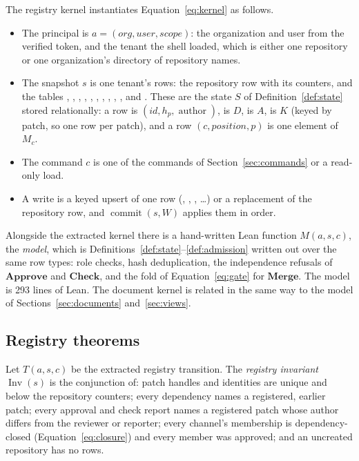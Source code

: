 The registry kernel instantiates Equation~\ref{eq:kernel} as follows.
\begin{itemize}
\item The principal is $a=(\mathit{org},\mathit{user},\mathit{scope})$: the organization and user from the verified token, and the tenant the shell loaded, which is either one repository or one organization's directory of repository names.
\item The snapshot $s$ is one tenant's rows: the repository row with its counters, and the tables , , , , , , , , , , and . These are the state $S$ of Definition~\ref{def:state} stored relationally: a  row is $(\mathit{id},h_p,\operatorname{author})$,  is $D$,  is $A$,  is $K$ (keyed by patch, so one row per patch), and a  row $(c,\mathit{position},p)$ is one element of $M_c$.
\item The command $c$ is one of the commands of Section~\ref{sec:commands} or a read-only load.
\item A write is a keyed upsert of one row (, , , \dots) or a replacement of the repository row, and $\operatorname{commit}(s,W)$ applies them in order.
\end{itemize}
Alongside the extracted kernel there is a hand-written Lean function $M(a,s,c)$, the \emph{model}, which is Definitions~\ref{def:state}--\ref{def:admission} written out over the same row types: role checks, hash deduplication, the independence refusals of $\mathbf{Approve}$ and $\mathbf{Check}$, and the fold of Equation~\ref{eq:gate} for $\mathbf{Merge}$. The model is 293 lines of Lean. The document kernel is related in the same way to the model of Sections~\ref{sec:documents} and~\ref{sec:views}.

\subsection{Registry theorems}\label{sec:registry}
Let $T(a,s,c)$ be the extracted registry transition. The \emph{registry invariant} $\operatorname{Inv}(s)$ is the conjunction of: patch handles and identities are unique and below the repository counters; every dependency names a registered, earlier patch; every approval and check report names a registered patch whose author differs from the reviewer or reporter; every channel's membership is dependency-closed (Equation~\ref{eq:closure}) and every member was approved; and an uncreated repository has no rows.

